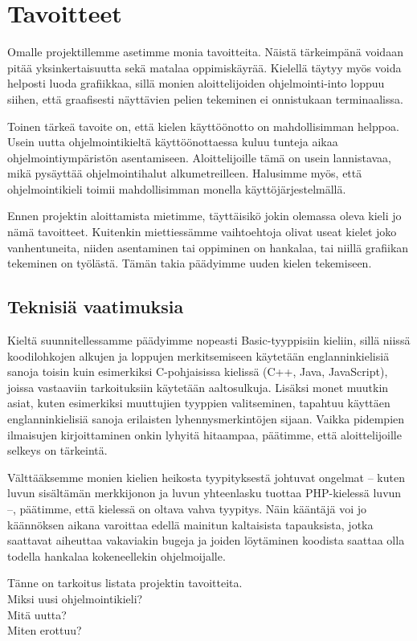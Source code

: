 \section{Tavoitteet}
Omalle projektillemme asetimme monia tavoitteita.
Näistä tärkeimpänä voidaan pitää yksinkertaisuutta
sekä matalaa oppimiskäyrää.
Kielellä täytyy myös voida helposti luoda grafiikkaa,
sillä monien aloittelijoiden ohjelmointi-into loppuu siihen,
että graafisesti näyttävien pelien tekeminen ei onnistukaan terminaalissa.

Toinen tärkeä tavoite on,
että kielen käyttöönotto on mahdollisimman helppoa.
Usein uutta ohjelmointikieltä käyttöönottaessa
kuluu tunteja aikaa ohjelmointiympäristön asentamiseen.
Aloittelijoille tämä on usein lannistavaa,
mikä pysäyttää ohjelmointihalut alkumetreilleen.
Halusimme myös, että ohjelmointikieli toimii mahdollisimman monella käyttöjärjestelmällä.

Ennen projektin aloittamista mietimme,
täyttäisikö jokin olemassa oleva kieli jo nämä tavoitteet.
Kuitenkin miettiessämme vaihtoehtoja
olivat useat kielet joko vanhentuneita,
niiden asentaminen tai oppiminen on hankalaa,
tai niillä grafiikan tekeminen on työlästä.
Tämän takia päädyimme uuden kielen tekemiseen.

\subsection{Teknisiä vaatimuksia}
Kieltä suunnitellessamme päädyimme nopeasti Basic-tyyppisiin kieliin,
sillä niissä koodilohkojen alkujen ja loppujen merkitsemiseen käytetään englanninkielisiä sanoja
toisin kuin esimerkiksi C-pohjaisissa kielissä (C++, Java, JavaScript),
joissa vastaaviin tarkoituksiin käytetään aaltosulkuja.
Lisäksi monet muutkin asiat,
kuten esimerkiksi muuttujien tyyppien valitseminen,
tapahtuu käyttäen englanninkielisiä sanoja erilaisten lyhennysmerkintöjen sijaan.
Vaikka pidempien ilmaisujen kirjoittaminen onkin lyhyitä hitaampaa,
päätimme, että aloittelijoille selkeys on tärkeintä.

Välttääksemme monien kielien heikosta tyypityksestä johtuvat ongelmat
-- kuten luvun sisältämän merkkijonon ja luvun yhteenlasku tuottaa PHP-kielessä luvun  --,
päätimme, että kielessä on oltava vahva tyypitys.
Näin kääntäjä voi jo käännöksen aikana varoittaa edellä mainitun kaltaisista tapauksista,
jotka saattavat aiheuttaa vakaviakin bugeja ja
joiden löytäminen koodista saattaa olla todella hankalaa kokeneellekin ohjelmoijalle.

\begin{comment}
Usein uutta ohjelmointikieltä käyttöönottaessani
minulla kuluu enemmän aikaa ohjelmointiympäristön asentamiseen
kuin uuden kielen oppimiseen.
Vaikka tämä ongelma ei suoranaisesti
\end{comment}

\begin{anfxnote}{}
Tänne on tarkoitus listata projektin tavoitteita.
\\
Miksi uusi ohjelmointikieli?
\\
Mitä uutta?
\\
Miten erottuu?
\end{anfxnote}